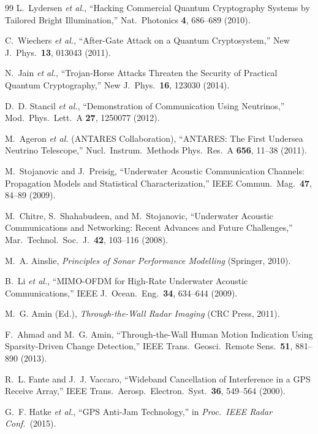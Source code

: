 \documentclass[twocolumn,superscriptaddress,prd,nofootinbib]{revtex4-2}
\begin{document}
\begin{thebibliography}{99}
L.~Lydersen \textit{et al.}, ``Hacking Commercial Quantum Cryptography
Systems by Tailored Bright Illumination,'' Nat.\ Photonics \textbf{4},
686--689 (2010).

C.~Wiechers \textit{et al.}, ``After-Gate Attack on a Quantum
Cryptosystem,'' New J.\ Phys.\ \textbf{13}, 013043 (2011).

N.~Jain \textit{et al.}, ``Trojan-Horse Attacks Threaten the Security
of Practical Quantum Cryptography,'' New J.\ Phys.\ \textbf{16},
123030 (2014).

D.~D. Stancil \textit{et al.}, ``Demonstration of Communication Using
Neutrinos,'' Mod.\ Phys.\ Lett.\ A \textbf{27}, 1250077 (2012).

M.~Ageron \textit{et al.} (ANTARES Collaboration), ``ANTARES: The First
Undersea Neutrino Telescope,'' Nucl.\ Instrum.\ Methods Phys.\ Res.\
A \textbf{656}, 11--38 (2011).

M.~Stojanovic and J.~Preisig, ``Underwater Acoustic Communication
Channels: Propagation Models and Statistical Characterization,''
IEEE Commun.\ Mag.\ \textbf{47}, 84--89 (2009).

M.~Chitre, S.~Shahabudeen, and M.~Stojanovic, ``Underwater Acoustic
Communications and Networking: Recent Advances and Future Challenges,''
Mar.\ Technol.\ Soc.\ J.\ \textbf{42}, 103--116 (2008).

M.~A. Ainslie, \textit{Principles of Sonar Performance Modelling}
(Springer, 2010).

B.~Li \textit{et al.}, ``MIMO-OFDM for High-Rate Underwater Acoustic
Communications,'' IEEE J.\ Ocean.\ Eng.\ \textbf{34}, 634--644 (2009).

M.~G. Amin (Ed.), \textit{Through-the-Wall Radar Imaging} (CRC Press, 2011).

F.~Ahmad and M.~G. Amin, ``Through-the-Wall Human Motion Indication
Using Sparsity-Driven Change Detection,'' IEEE Trans.\ Geosci.\
Remote Sens.\ \textbf{51}, 881--890 (2013).

R.~L. Fante and J.~J. Vaccaro, ``Wideband Cancellation of
Interference in a GPS Receive Array,'' IEEE Trans.\ Aerosp.\ Electron.\
Syst.\ \textbf{36}, 549--564 (2000).

\bibitem{Hatke2015CRPA}
G.~F. Hatke \textit{et al.}, ``GPS Anti-Jam Technology,''
in \textit{Proc.\ IEEE Radar Conf.}\ (2015).


\end{thebibliography}
\end{document}
